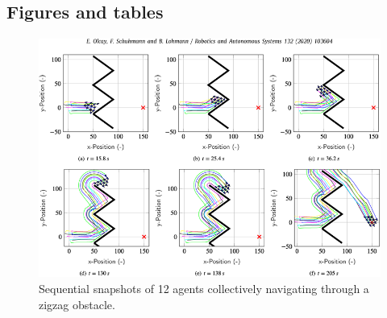 \documentclass[conference]{IEEEtran}
\begin{document}
\subsection*{Figures and tables}
\begin{figure}[]
    \centering
    \includegraphics[width=1.0\textwidth]{Pictures/Sequential snapshots of 12 agents collectively navigating through a zigzag obstacle.png}
    \caption{Sequential snapshots of 12 agents collectively navigating through a zigzag obstacle.}
    \label{fig:Sequential snapshots of 12 agents collectively navigating through a zigzag obstacle}
\end{figure}




\end{document}
